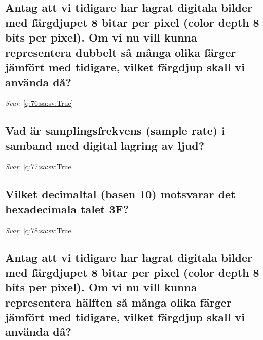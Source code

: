 \documentclass[a4paper,11pt,oneside]{article}
\begin{document}
\begin{sloppypar}
\subsection{Antag att vi tidigare har lagrat digitala bilder med f\"argdjupet 8 bitar per pixel (color depth 8 bits per pixel). Om vi nu vill kunna representera dubbelt s\r{a} m\r{a}nga olika f\"arger j\"amf\"ort med tidigare, vilket f\"argdjup skall vi anv\"anda d\r{a}?}

\label{q:76:sa:sv:False}

\vspace{2cm}

\noindent\makebox[\textwidth]{\hrulefill}

\vspace{1cm}

\textit{Svar}: \autoref{q:76:sa:sv:True}



\subsection{Vad \"ar samplingsfrekvens (sample rate) i samband med digital lagring av ljud?}

\label{q:77:sa:sv:False}

\vspace{2cm}

\noindent\makebox[\textwidth]{\hrulefill}

\vspace{1cm}

\textit{Svar}: \autoref{q:77:sa:sv:True}



\subsection{Vilket decimaltal (basen 10) motsvarar det hexadecimala talet 3F?}

\label{q:78:sa:sv:False}

\vspace{2cm}

\noindent\makebox[\textwidth]{\hrulefill}

\vspace{1cm}

\textit{Svar}: \autoref{q:78:sa:sv:True}



\subsection{Antag att vi tidigare har lagrat digitala bilder med f\"argdjupet 8 bitar per pixel (color depth 8 bits per pixel). Om vi nu vill kunna representera h\"alften s\r{a} m\r{a}nga olika f\"arger j\"amf\"ort med tidigare, vilket f\"argdjup skall vi anv\"anda d\r{a}?}


\end{sloppypar}
\end{document}
